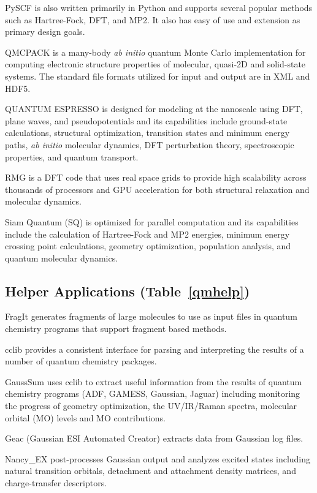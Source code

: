 PySCF is also written primarily in Python and supports several popular methods such as Hartree-Fock, DFT, and MP2. It also has easy of use and extension as primary design goals.

QMCPACK \cite{kim2010quantum} is a many-body \textit{ab initio} quantum Monte Carlo implementation for computing electronic structure properties of molecular, quasi-2D and solid-state systems. The standard file formats utilized for input and output are in XML and HDF5.

QUANTUM ESPRESSO \cite{Giannozzi_2009} is designed for modeling at the nanoscale using DFT, plane waves, and pseudopotentials and its capabilities include ground-state calculations, structural optimization, transition states and minimum energy paths, \textit{ab initio} molecular dynamics, DFT perturbation theory, spectroscopic properties, and quantum transport.

RMG \cite{moore2012scaling} is a DFT code that uses real space grids to provide high scalability across thousands of processors and GPU acceleration for both structural relaxation and molecular dynamics.

Siam Quantum (SQ) is optimized for parallel computation and its capabilities include the calculation of Hartree-Fock and MP2 energies, minimum energy crossing point calculations, geometry optimization, population analysis, and quantum molecular dynamics.


\subsection*{Helper Applications (Table~\ref{qmhelp})}
FragIt \cite{Steinmann_2012} generates fragments of large molecules to use as input files in quantum chemistry programs that support fragment based methods.

cclib \cite{O_boyle_2008} provides a consistent interface for parsing and interpreting the results of a number of quantum chemistry packages. 

GaussSum \cite{O_boyle_2008} uses cclib to extract useful information from the results of quantum chemistry programs (ADF, GAMESS, Gaussian, Jaguar) including monitoring the progress of geometry optimization, the UV/IR/Raman spectra, molecular orbital (MO) levels and MO contributions.

Geac (Gaussian ESI Automated Creator) extracts data from Gaussian log files. 

Nancy\_EX \cite{Etienne_2014} post-processes Gaussian output and analyzes excited states including natural transition orbitals, detachment and attachment density matrices, and charge-transfer descriptors.

